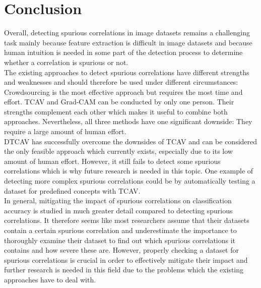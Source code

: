 \documentclass{article}
\begin{document}
\section{Conclusion}
Overall, detecting spurious correlations in image datasets remains a challenging task mainly because feature extraction is difficult in image datasets and
because human intuition is needed in some part of the detection process to determine whether a correlation is spurious or not. \\
The existing approaches to detect spurious correlations have different strengths and weaknesses and should therefore be used under different circumstances: 
Crowdsourcing is the most effective approach but requires the most time and effort. TCAV and Grad-CAM can be conducted by only one person. 
Their strengths complement each other which makes it useful to combine both approaches. Nevertheless, all three methods have one significant downside: 
They require a large amount of human effort. \\
DTCAV has successfully overcome the downsides of TCAV and can be considered the only feasible approach
which currently exists, especially due to its low amount of human effort. However, it still fails to detect some spurious correlations which is why future
research is needed in this topic. One example of detecting more complex spurious correlations could be by automatically testing a dataset for predefined
concepts with TCAV.\\
In general, mitigating the impact of spurious correlations on classification accuracy is studied in much greater detail compared to detecting spurious
correlations. It therefore seems like most researchers assume that their datasets contain a certain spurious correlation and 
underestimate the importance to thoroughly examine their dataset to find out which spurious correlations it contains and how severe these are. 
However, properly checking a dataset for spurious correlations is crucial in order to effectively mitigate their impact and further research
is needed in this field due to the problems which the existing approaches have to deal with.

\printbibliography
\end{document}
